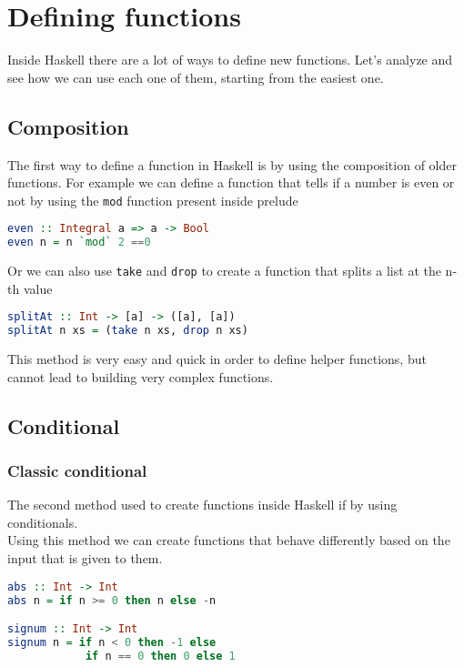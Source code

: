 \newpage
\chapter{Defining functions}
Inside Haskell there are a lot of ways to define new functions. Let's analyze and see how we can use each one of them, starting from the easiest one. 

\section{Composition}
The first way to define a function in Haskell is by using the composition of older functions. For example we can define a function that tells if a number is even or not by using the \texttt{mod} function present inside prelude

\begin{lstlisting}[language=haskell]
even :: Integral a => a -> Bool
even n = n `mod` 2 ==0
\end{lstlisting}

Or we can also use \texttt{take} and \texttt{drop} to create a function that splits a list at the n-th value

\begin{lstlisting}[language=haskell]
splitAt :: Int -> [a] -> ([a], [a])
splitAt n xs = (take n xs, drop n xs)
\end{lstlisting}

This method is very easy and quick in order to define helper functions, but cannot lead to building very complex functions. 

\section{Conditional}
\subsection{Classic conditional}
The second method used to create functions inside Haskell if by using conditionals. \\
Using this method we can create functions that behave differently based on the input that is given to them.

\begin{lstlisting}[language=haskell]
abs :: Int -> Int
abs n = if n >= 0 then n else -n

signum :: Int -> Int
signum n = if n < 0 then -1 else 
			if n == 0 then 0 else 1
\end{lstlisting}

